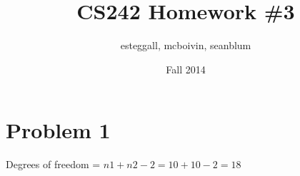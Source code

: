 \documentclass{article}
\title{CS242 Homework \#3}
\author{esteggall, mcboivin, seanblum}
\date{Fall 2014}
\begin{document}
 \maketitle \pagestyle{empty}
\section*{Problem 1}
Degrees of freedom = $n1 + n2 -2 = 10 + 10 -2 = 18$\\


\end{document}
